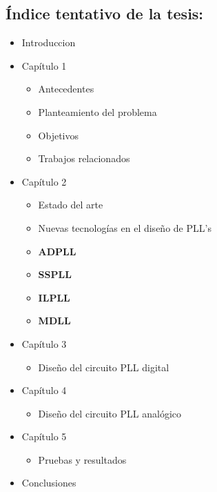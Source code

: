 \documentclass[runningheads,a4paper]{llncs}
\begin{document}
\subsection{Índice tentativo de la tesis:}
\begin{itemize}
\item Introduccion
\item Capítulo 1
\begin{itemize}
    \item Antecedentes
    \item Planteamiento del problema
    \item Objetivos
    \item Trabajos relacionados
\end{itemize}
\item Capítulo 2
\begin{itemize}
    \item Estado del arte
    \item Nuevas tecnologías en el diseño de PLL's
    \item \textbf{ADPLL}
    \item \textbf{SSPLL}
    \item \textbf{ILPLL}
    \item \textbf{MDLL}
\end{itemize}
\item Capítulo 3
\begin{itemize}
    \item Diseño del circuito PLL digital
\end{itemize}
\item Capítulo 4
\begin{itemize}
    \item Diseño del circuito PLL analógico
\end{itemize}
\item Capítulo 5
\begin{itemize}
    \item Pruebas y resultados
\end{itemize}
\item Conclusiones
\end{itemize}
\end{document}
